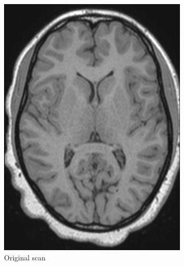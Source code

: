 \documentclass{standalone}
\begin{document}
\begin{figure}[H]
\begin{subfigure}[b]{0.325\textwidth}
             \includegraphics[scale=0.25]{img/Chap3/T1W54_2.png}
             \caption{Original scan}
        \end{subfigure}
        \hfill
        \begin{subfigure}[b]{0.325\textwidth}

\end{subfigure}
\end{figure}
\end{document}
